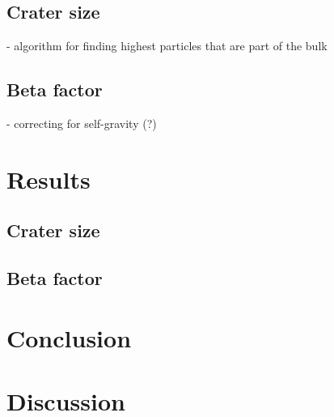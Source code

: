 \documentclass{article}
\begin{document}
\subsection{Crater size}
- algorithm for finding highest particles that are part of the bulk
\subsection{Beta factor}
- correcting for self-gravity (?)
\section{Results}
\subsection{Crater size}
\subsection{Beta factor}
\section{Conclusion}
\section{Discussion}

\newpage
\printbibliography
\end{document}

